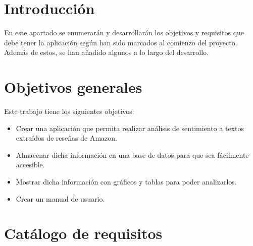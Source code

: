 ﻿
\section{Introducción}
En este apartado se enumerarán y desarrollarán los objetivos y requisitos que debe 
tener la aplicación según han sido marcados al comienzo del proyecto. Además de estos,
se han añadido algunos a lo largo del desarrollo.

\section{Objetivos generales}
Este trabajo tiene los siguientes objetivos:
\begin{itemize}
	\item Crear una aplicación que permita realizar análisis de sentimiento a textos extraídos de reseñas de Amazon.
	\item Almacenar dicha información en una base de datos para que sea fácilmente accesible.
	\item Mostrar dicha información con gráficos y tablas para poder analizarlos.
	\item Crear un manual de usuario.
\end{itemize}

\section{Catálogo de requisitos}
